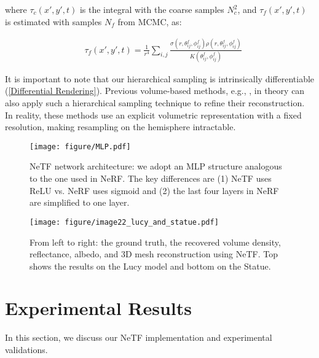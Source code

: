\documentclass[10pt,journal,compsoc]{IEEEtran}
\begin{document}
\noindent where $\tau_c(x',y',t)$ is the integral with the coarse samples $N_c^2$, and $\tau_f(x',y',t)$ is estimated with samples $N_f$ from MCMC, as:

\begin{equation}
\begin{aligned}
&\tau_f(x',y',t) = \frac{1}{r^4} \sum_{i,j} \frac{ \sigma(r, \theta^{f}_{ij},\phi^{f}_{ij}) \rho(r, \theta^{f}_{ij},\phi^{f}_{ij})}{K(\theta^{f}_{ij},\phi^{f}_{ij})}
\end{aligned}
\end{equation}

It is important to note that our hierarchical sampling is intrinsically differentiable (\ref{Differential Rendering}). Previous volume-based methods, e.g., \cite{2012Velten, 2018LCT, 2020DLCT, 2019FK}, in theory can also apply such a hierarchical sampling technique to refine their reconstruction. In reality, these methods use an explicit volumetric representation with a fixed resolution, making resampling on the hemisphere intractable. 


\begin{figure}[!t]
\centering
\texttt{[image: figure/MLP.pdf]}
\caption{NeTF network architecture: we adopt an MLP structure analogous to the one used in NeRF. The key differences are (1) NeTF uses ReLU vs. NeRF uses sigmoid and (2) the last four layers in NeRF are simplified to one layer.}
\label{MLP}
\end{figure}

\begin{figure*}[htbp]
\centering
\texttt{[image: figure/image22\_lucy\_and\_statue.pdf]}
\caption{From left to right: the ground truth, the recovered volume density, reflectance, albedo, and 3D mesh reconstruction using NeTF. Top shows the results on the Lucy model and bottom on the Statue. }
\label{LucyStatue}
\end{figure*}


\section{Experimental Results}
In this section, we discuss our NeTF implementation and experimental validations.
\end{document}
